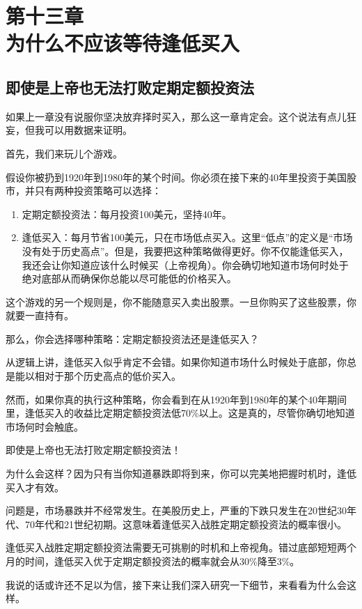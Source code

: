\section[第十三章\q 为什么不应该等待逢低买入]{第十三章\\ 为什么不应该等待逢低买入}
\renewcommand{\bookchapter}{13}
\setcounter{figure}{0}
\setcounter{table}{0}
\subsection{即使是上帝也无法打败定期定额投资法}
如果上一章没有说服你坚决放弃择时买入，那么这一章肯定会。这个说法有点儿狂妄，但我可以用数据来证明。

首先，我们来玩儿个游戏。

假设你被扔到1920年到1980年的某个时间。你必须在接下来的40年里投资于美国股市，并只有两种投资策略可以选择：

\begin{enumerate}
\item 定期定额投资法：每月投资100美元，坚持40年。
\item 逢低买入：每月节省100美元，只在市场低点买入。这里“低点”的定义是“市场没有处于历史高点”。但是，我要把这种策略做得更好。你不仅能逢低买入，我还会让你知道应该什么时候买（上帝视角）。你会确切地知道市场何时处于绝对底部从而确保你总能以尽可能低的价格买入。
\end{enumerate}

这个游戏的另一个规则是，你不能随意买入卖出股票。一旦你购买了这些股票，你就要一直持有。

那么，你会选择哪种策略：定期定额投资法还是逢低买入？

从逻辑上讲，逢低买入似乎肯定不会错。如果你知道市场什么时候处于底部，你总是能以相对于那个历史高点的低价买入。

然而，如果你真的执行这种策略，你会看到在从1920年到1980年的某个40年期间里，逢低买入的收益比定期定额投资法低70\%以上。这是真的，尽管你确切地知道市场何时会触底。

即使是上帝也无法打败定期定额投资法！

为什么会这样？因为只有当你知道暴跌即将到来，你可以完美地把握时机时，逢低买入才有效。

问题是，市场暴跌并不经常发生。在美股历史上，严重的下跌只发生在20世纪30年代、70年代和21世纪初期。这意味着逢低买入战胜定期定额投资法的概率很小。

逢低买入战胜定期定额投资法需要无可挑剔的时机和上帝视角。错过底部短短两个月的时间，逢低买入优于定期定额投资法的概率就会从30\%降至3\%。

我说的话或许还不足以为信，接下来让我们深入研究一下细节，来看看为什么会这样。

